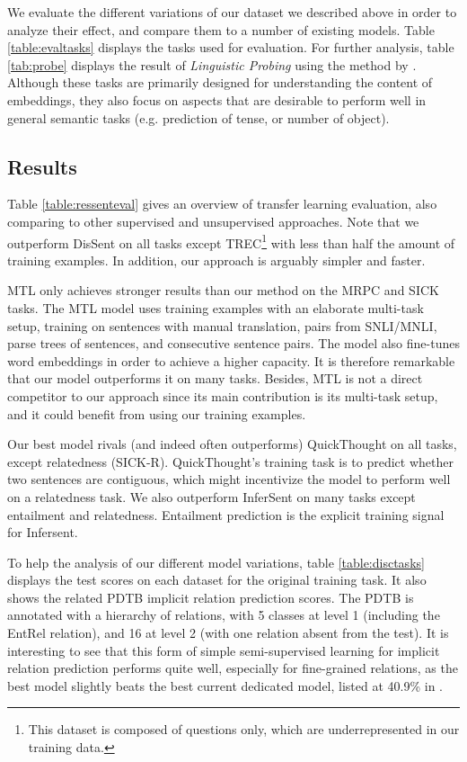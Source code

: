 \documentclass[11pt,a4paper]{article}
\begin{document}
We evaluate the different variations of our dataset we described above in order to analyze their effect, and compare them to a number of existing models. Table \ref{table:evaltasks} displays the tasks used for evaluation.
For further analysis, table \ref{tab:probe} displays the result of {\it Linguistic Probing} using the method by \citet{ConneauProbe}.  Although these tasks are primarily designed for understanding the content of embeddings, they also focus on aspects that are desirable to perform well in general semantic tasks (e.g. prediction of tense, or number of object).

\subsection{Results}
Table \ref{table:ressenteval} gives an overview of transfer learning evaluation, also comparing to other supervised and unsupervised approaches.
Note that we outperform DisSent on all tasks except TREC\footnote{This dataset is composed of questions only, which are underrepresented in our training data.} with less than half the amount of training examples. In addition, our approach is arguably simpler and faster.

MTL \cite{subramanian2018learning} only achieves stronger results than our method on the MRPC and SICK tasks. The MTL model uses  training examples with an elaborate multi-task setup, training on  sentences with manual translation,  pairs from SNLI/MNLI,  parse trees of sentences, and  consecutive sentence pairs. The model also fine-tunes word embeddings in order to achieve a higher capacity. It is therefore remarkable that our model outperforms it on many tasks. Besides, MTL is not a direct competitor to our approach since its main contribution is its multi-task setup, and it could benefit from using our training examples. 

Our best model rivals (and indeed often outperforms) QuickThought on all tasks, except relatedness (SICK-R). QuickThought's training task is to predict whether two sentences are contiguous, which might incentivize the model to perform well on a relatedness task. We also outperform InferSent on many tasks except entailment and relatedness. Entailment prediction is the explicit training signal for Infersent.

To help the analysis of our different model variations, table \ref{table:disctasks} displays the test scores on each dataset for the original training task. It also shows the related PDTB implicit relation prediction scores. 
The PDTB is annotated with a hierarchy of relations, with 5 classes at level 1 (including the EntRel relation), and 16 at level 2 (with one relation absent from the test). 
It is interesting to see that this form of simple semi-supervised learning for implicit relation prediction performs quite well, especially for fine-grained relations, as the best model slightly beats the best current dedicated model, listed at 40.9\% in \citet{DBLP:conf/eacl/XueDR17}. 
\end{document}
